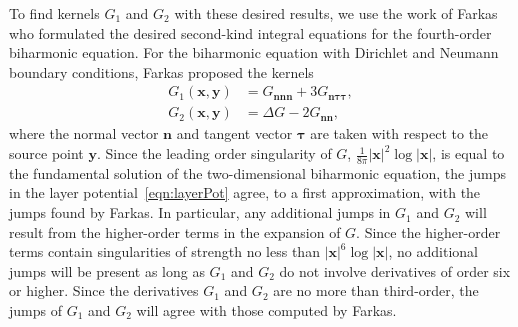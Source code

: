 \documentclass[times]{article}
\newcommand{\nn}{\mathbf{n}}
\newcommand{\ttau}{\boldsymbol{\tau}}
\newcommand{\xx}{\mathbf{x}}
\newcommand{\yy}{\mathbf{y}}
\begin{document}
To find kernels $G_1$ and $G_2$ with these desired results, we use the
work of Farkas~\cite{far1989} who formulated the desired second-kind
integral equations for the fourth-order biharmonic equation.  For the
biharmonic equation with Dirichlet and Neumann boundary conditions,
Farkas proposed the kernels
\begin{align*}
  G_{1}(\xx,\yy) &= G_{\nn\nn\nn} + 3G_{\nn\ttau\ttau}, \\
  G_{2}(\xx,\yy) &= \Delta G - 2G_{\nn\nn},
\end{align*}
where the normal vector $\nn$ and tangent vector $\ttau$ are taken with
respect to the source point $\yy$.  Since the leading order singularity
of $G$, $\frac{1}{8\pi}|\xx|^{2}\log|\xx|$, is equal to the fundamental
solution of the two-dimensional biharmonic equation, the jumps in the
layer potential~\eqref{eqn:layerPot} agree, to a first approximation,
with the jumps found by Farkas.  In particular, any additional jumps in
$G_1$ and $G_2$ will result from the higher-order terms in the expansion
of $G$.  Since the higher-order terms contain singularities of strength
no less than $|\xx|^{6}\log|\xx|$, no additional jumps will be present
as long as $G_1$ and $G_2$ do not involve derivatives of order six or
higher.  Since the derivatives $G_1$ and $G_2$ are no more than
third-order, the jumps of $G_1$ and $G_2$ will agree with those computed
by Farkas.

\end{document}
